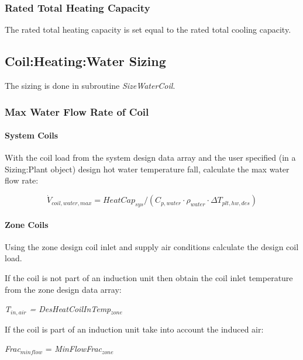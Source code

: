 \subsubsection{Rated Total Heating Capacity}\label{rated-total-heating-capacity-1}

The rated total heating capacity is set equal to the rated total cooling capacity.

\subsection{Coil:Heating:Water Sizing}\label{coilheatingwater-sizing}

The sizing is done in subroutine \emph{SizeWaterCoil}.

\subsubsection{Max Water Flow Rate of Coil}\label{max-water-flow-rate-of-coil-1}

\paragraph{System Coils}\label{system-coils}

With the coil load from the system design data array and the user specified (in a Sizing:Plant object) design hot water temperature fall, calculate the max water flow rate:

\begin{equation}
\dot V_{coil,water,max} = HeatCap_{sys}/(C_{p,water} \cdot \rho_{water} \cdot \Delta T_{plt,hw,des})
\end{equation}

\paragraph{Zone Coils}\label{zone-coils}

Using the zone design coil inlet and supply air conditions calculate the design coil load.

If the coil is not part of an induction unit then obtain the coil inlet temperature from the zone design data array:

\emph{T\(_{in,air}\) = DesHeatCoilInTemp\(_{zone}\)}

If the coil is part of an induction unit take into account the induced air:

\emph{Frac\(_{minflow}\)} = \emph{MinFlowFrac\(_{zone}\)}

